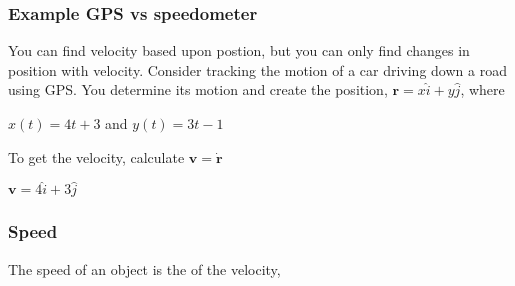 \documentclass[letterpaper,10pt,english]{sphinxmanual}
\begin{document}
\subsubsection{Example \sphinxhyphen{} GPS vs speedometer}
\label{\detokenize{module_01/kinematics:example-gps-vs-speedometer}}
You can find velocity based upon postion, but you can only find changes
in position with velocity. Consider tracking the motion of a car driving
down a road using GPS. You determine its motion and create the position,
\(\mathbf{r} = x\hat{i} +y\hat{j}\), where

\(x(t) = 4t +3\) and \(y(t) = 3t - 1\)

To get the velocity, calculate \(\mathbf{v} = \dot{\mathbf{r}}\)

\(\mathbf{v} = 4\hat{i} +3 \hat{j}\)

\begin{sphinxVerbatim}[commandchars=\\\{\}]
  
    
   
\end{sphinxVerbatim}

\noindent{}


\subsubsection{Speed}
\label{\detokenize{module_01/kinematics:speed}}
The speed of an object is the
 of the
velocity,
\end{document}
